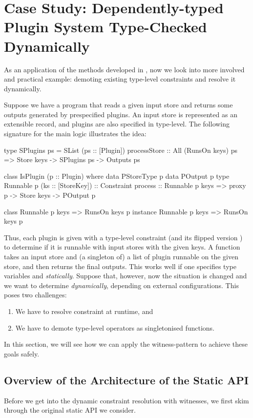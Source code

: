 \documentclass[demotion-paper.tex]{subfiles}
\begin{document}
\section{Case Study: Dependently-typed Plugin System Type-Checked Dynamically}
\label{sec:plugins}

As an application of the methods developed in , now we look into more involved and practical example: demoting existing type-level constraints and resolve it dynamically.

Suppose we have a program that reads a given input store and returns some outputs generated by prespecified plugins.
An input store is represented as an extensible record, and plugins are also specified in type-level.
The following signature for the main logic illustrates the idea:
\begin{code}
type SPlugins ps = SList (ps :: [Plugin])
processStore :: All (RunsOn keys) ps
  => Store keys -> SPlugins ps -> Outputs ps

class IsPlugin (p :: Plugin) where
  data PStoreType p
  data POutput p
  type Runnable p (ks :: [StoreKey]) :: Constraint
  process :: Runnable p keys
    => proxy p -> Store keys -> POutput p

class Runnable p keys => RunsOn keys p
instance Runnable p keys => RunsOn keys p
\end{code}
Thus, each plugin  is given with a type-level constraint  (and its flipped version ) to determine if it is runnable with input stores with the given keys.
A function  takes an input store and (a singleton of) a list of plugin runnable on the given store, and then returns the final outputs.
This works well if one specifies type variables  and  \emph{statically}.
Suppose that, however, now the situation is changed and we want to determine  \emph{dynamically}, depending on external configurations.
This poses two challenges:
\begin{enumerate}
  \item We have to resolve constraint  at runtime, and
  \item We have to demote type-level operators as singletonised functions.
\end{enumerate}
In this section, we will see how we can apply the witness-pattern to achieve these goals safely.

\subsection{Overview of the Architecture of the Static API}\label{sec:static-api}
Before we get into the dynamic constraint resolution with witnesses, we first skim through the original static API we consider.
\end{document}
